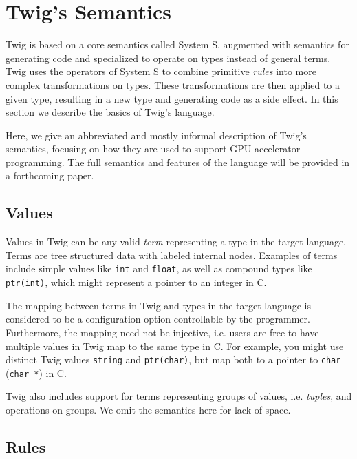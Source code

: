 
\section{Twig's Semantics}
\label{semantics}

Twig is based on a core semantics called System S\cite{Visser:1998p333},
augmented with semantics for generating code and specialized to operate on types
instead of general terms. Twig uses the operators of System S to combine
primitive \emph{rules} into more complex transformations on types. These
transformations are then applied to a given type, resulting in a new type and
generating code as a side effect. In this section we describe the basics of
Twig's language.

Here, we give an abbreviated and mostly informal description of Twig's
semantics, focusing on how they are used to support GPU accelerator programming.
The full semantics and features of the language will be provided in a
forthcoming paper.

\subsection{Values}

Values in Twig can be any valid \emph{term} representing a type in the target
language. Terms are tree structured data with labeled internal nodes. Examples
of terms include simple values like \texttt{int} and \texttt{float}, as well as
compound types like \texttt{ptr(int)}, which might represent a pointer to an
integer in C.

The mapping between terms in Twig and types in the target language is considered
to be a configuration option controllable by the programmer. Furthermore, the
mapping need not be injective, i.e. users are free to have multiple values in
Twig map to the same type in C. For example, you might use distinct Twig values
\texttt{string} and \texttt{ptr(char)}, but map both to a pointer to
\texttt{char} (\texttt{char *}) in C.

Twig also includes support for terms representing groups of values, i.e.
\emph{tuples}, and operations on groups. We omit the semantics here for lack of
space.

\subsection{Rules}
\label{sec:rules}


